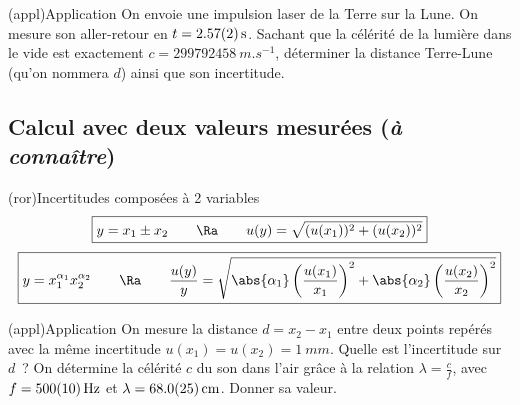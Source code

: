 \documentclass[../main/main.tex]{subfiles}
\begin{document}
\begin{tcb}[breakable](appl){Application}
  On envoie une impulsion laser de la Terre sur la Lune. On mesure son
  aller-retour en $t = \SI{2.57 \pm 0.02}{s}$. Sachant que la célérité de la
  lumière dans le vide est exactement $c = \SI{299792458}{m.s^{-1}}$, déterminer
  la distance Terre-Lune (qu'on nommera $d$) ainsi que son incertitude.
  \tcblower
  \vspace*{-10pt}
  \begin{isd}
    \vspace*{-10pt}
    \tcblower
  \vspace*{-10pt}
  \end{isd}
\end{tcb}

\subsection{Calcul avec deux valeurs mesurées (\textit{à connaître})}
\begin{tcb}(ror){Incertitudes composées à 2 variables}
\[
  \boxed{
  y = x_1 \pm x_2
  \qquad \Ra \qquad
  u(y) = \sqrt{(u(x_1))^{2} + (u(x_2))^{2}}}
\]
\tcblower
{}
\[
  \boxed{
    y = x_1^{\alpha_1}x_2^{\alpha_2}
    \qquad \Ra \qquad 
    \frac{u(y)}{y} = \sqrt{
      \abs{\alpha_1}\left(\frac{u(x_1)}{x_1}\right)^{2} +
      \abs{\alpha_2}\left(\frac{u(x_2)}{x_2}\right)^{2}
    }
  }
\]
\end{tcb}

\begin{tcb}(appl){Application}
  On mesure la distance $d = x_2 - x_1$ entre deux points repérés avec la même
  incertitude $u(x_1) = u(x_2) = \SI{1}{mm}$. Quelle est l'incertitude sur $d$~?
  \smallbreak
  \tcblower
  On détermine la célérité $c$ du son dans l'air grâce à la relation $\lambda =
  \frac{c}{f}$, avec $f = \SI{500 \pm 10}{Hz}$ et $\lambda = \SI{68.0 \pm
  2.5}{cm}$. Donner sa valeur.
  \smallbreak
\end{tcb}
\end{document}
